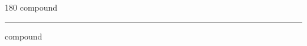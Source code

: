 
\begin{frame}
\begin{center}
\begin{turn}{180}
{\fontsize{2.5cm}{1em}\selectfont compound}
\end{turn}
\vspace{1em}\par  
\hrule
\vspace{1em}\par  
{\fontsize{2.5cm}{1em}\selectfont compound}
\end{center}
\end{frame}
